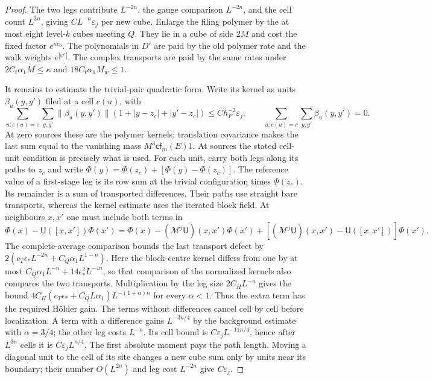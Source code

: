 \documentclass[11pt,letterpaper,reqno]{amsart}
\theoremstyle{definition}
\theoremstyle{remark}
\begin{document}
\begin{proof}
The two legs contribute $L^{-2n}$, the gauge comparison
$L^{-2n}$, and the cell count $L^{3n}$, giving
$CL^{-n}\varepsilon_j$ per new cube.
Enlarge the filing polymer by the at most eight level-$k$
cubes meeting $Q$.  They lie in a cube of side $2M$ and
cost the fixed factor $e^{\kappa c_0}$.  The polynomials
in $D'$ are paid by the old polymer rate and the walk
weights $e^{|\omega'|}$.  The complex transports are
paid by the same rates under
$2C_t\alpha_1M\le\kappa$ and
$18C_t\alpha_1M_w\le1$.

It remains to estimate the trivial-pair quadratic form.  Write
its kernel as units $\beta_u(y,y')$ filed at a cell $c(u)$,
with
\[
 \sum_{u:c(u)=c}\sum_{y,y'}\|\beta_u(y,y')\|
 (1+|y-z_c|+|y'-z_c|)\le Ch_F^{-2}\varepsilon_j,
 \qquad \sum_{u:c(u)=c}\sum_{y,y'}\beta_u(y,y')=0.
\]
At zero sources these are the polymer kernels; translation
covariance makes the last sum equal to the vanishing mass
$M^3\mathsf{cf}_m(E)1$.
At sources the stated cell-unit condition is precisely what
is used.  For each unit, carry both legs along its paths to
$z_c$ and write
$\Phi(y)=\Phi(z_c)+[\Phi(y)-\Phi(z_c)]$.
The reference value of a first-stage leg is its row sum
at the trivial configuration times $\Phi(z_c)$.  Its
remainder is a sum of transported differences.  Their
paths use straight bare transports, whereas the kernel
estimate uses the iterated block field.  At neighbours
$x,x'$ one must include both terms in
\[
 \Phi(x)-\mathsf U([x,x'])\Phi(x')
 =\Phi(x)-(\mathcal M^j\mathsf U)(x,x')\Phi(x')
 +[(\mathcal M^j\mathsf U)(x,x')-\mathsf U([x,x'])]\Phi(x').
\]
The complete-average comparison bounds the last transport
defect by $2(c_T\epsilon_*L^{-2n}+C_Q\alpha_1L^{1-n})$.
Here the block-centre kernel differs from one by at most
$C_Q\alpha_1L^{-n}+14\epsilon_*^2L^{-4n}$, so that
comparison of the normalized kernels also compares the
two transports.  Multiplication by the leg size
$2C_HL^{-n}$ gives the bound
$4C_H(c_T\epsilon_*+C_QL\alpha_1)L^{-(1+\alpha)n}$
for every $\alpha<1$.  Thus the extra term has the
required H\"older gain.  The terms without differences
cancel cell by cell before localization.  A term with a difference gains
$L^{-3n/4}$ by the background estimate with $\alpha=3/4$;
the other leg costs $L^{-n}$.  Its cell bound is
$C\varepsilon_jL^{-11n/4}$, hence after $L^{3n}$ cells it
is $C\varepsilon_jL^{n/4}$.  The first absolute moment
pays the path length.  Moving a diagonal unit to the cell of
its site changes a new cube sum only by units near its
boundary; their number $O(L^{2n})$ and leg cost $L^{-2n}$
give $C\varepsilon_j$.


\end{proof}
\end{document}
